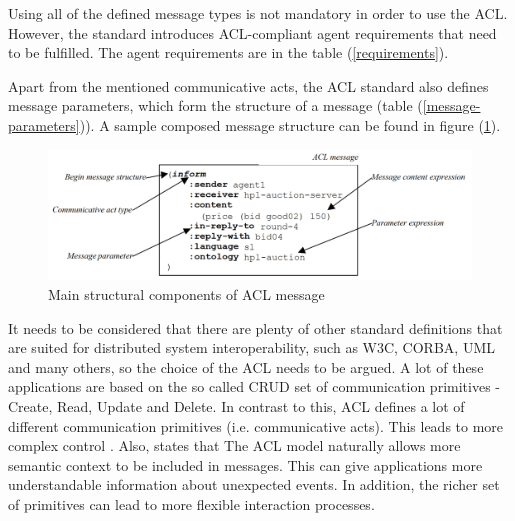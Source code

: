 \documentclass[main.tex]{subfiles}
\begin{document}
Using all of the defined message types is not mandatory in order to use the ACL.
However, the standard introduces ACL-compliant agent requirements that need to be fulfilled. The 
agent requirements are in the table (\ref{requirements}). 

Apart from the mentioned communicative acts, the ACL standard also defines message parameters, which
form the structure of a message (table (\ref{message-parameters})). A sample composed message structure can be found 
in figure (\ref{message-structure}).


\begin{figure}[htbp]
    \centering
    \includegraphics[width=.99\textwidth]{acl-message-structure.png}
    \caption{Main structural components of ACL message \cite{IntelligentPhysicalAgents2001}}
    \label{message-structure}
\end{figure}

It needs to be considered that there are plenty of other standard definitions that are suited for
distributed system interoperability, such as W3C, CORBA, UML and many others, so the choice 
of the ACL needs to be argued. A lot of these applications are based on the so called CRUD set of 
communication primitives - Create, Read, Update and Delete. In contrast to this, ACL defines a lot 
of different communication primitives (i.e. communicative acts). This leads to more complex control 
\cite{Poslad2007}. 
Also, \cite{Poslad2007} states that The ACL model naturally allows more semantic context
to be included in messages. This can give applications more understandable information about
unexpected events. In addition, the richer set of primitives can lead to more flexible
interaction processes.
\end{document}
